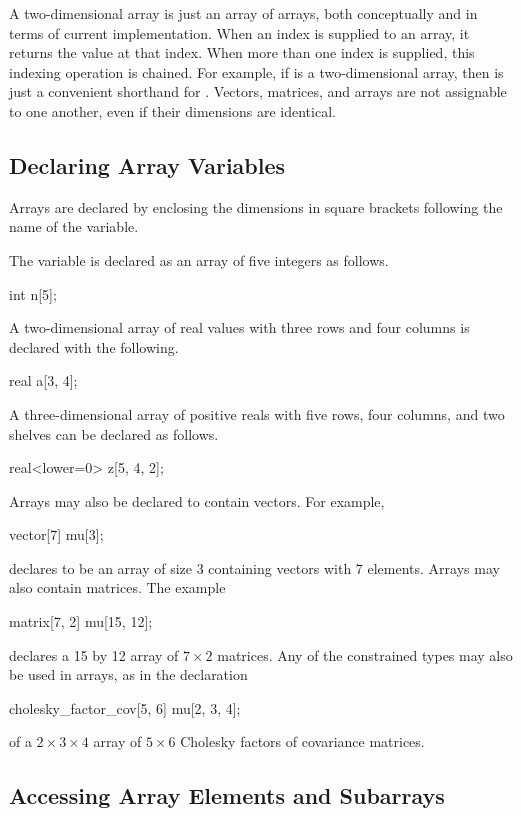 A two-dimensional array is just an array of arrays, both conceptually
and in terms of current implementation.  When an index is supplied to
an array, it returns the value at that index.  When more than one
index is supplied, this indexing operation is chained.  For example, if
 is a two-dimensional array, then  is just
a convenient shorthand for .
%
Vectors, matrices, and arrays are not assignable to one another, even
if their dimensions are identical.

\subsection{Declaring Array Variables}

Arrays are declared by enclosing the dimensions in square brackets
following the name of the variable.

The variable  is declared as an array of five integers as follows.
%
\begin{stancode}
int n[5];
\end{stancode}
%
A two-dimensional array of real values with three rows and four columns is
declared with the following.
%
\begin{stancode}
real a[3, 4];
\end{stancode}
%
A three-dimensional array  of positive reals with five rows, four
columns, and two shelves can be declared as follows.
%
\begin{stancode}
real<lower=0> z[5, 4, 2];
\end{stancode}
%

Arrays may also be declared to contain vectors.  For example,
%
\begin{stancode}
vector[7] mu[3];
\end{stancode}
%
declares  to be an array of size 3 containing vectors with 7
elements.  Arrays may also contain matrices.  The example
%
\begin{stancode}
matrix[7, 2] mu[15, 12];
\end{stancode}
%
declares a 15 by 12 array of $7 \times 2$ matrices.
Any of the constrained types may also be used in arrays, as in the
declaration
%
\begin{stancode}
cholesky_factor_cov[5, 6] mu[2, 3, 4];
\end{stancode}
%
of a $2 \times 3 \times 4$ array of $5 \times 6$ Cholesky factors of
covariance matrices.

\subsection{Accessing Array Elements and Subarrays}

